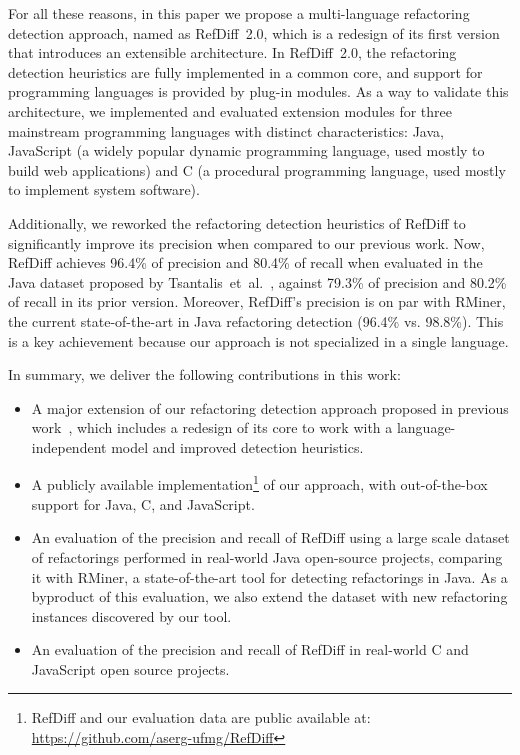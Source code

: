 \documentclass[10pt,journal,compsoc]{IEEEtran}
\begin{document}
For all these reasons, in this paper we propose a multi-language refactoring detection approach, named as RefDiff~2.0, which is a redesign of its first version that introduces an extensible architecture.
In RefDiff~2.0, the refactoring detection heuristics are fully implemented in a common core, and support for programming languages is provided by plug-in modules.
As a way to validate this architecture, we implemented and evaluated extension modules for three mainstream programming languages with distinct characteristics: Java, JavaScript (a widely popular dynamic programming language, used mostly to build web applications) and C (a procedural programming language, used mostly to implement system software).

Additionally, we reworked the refactoring detection heuristics of RefDiff to significantly improve its precision when compared to our previous work.
Now, RefDiff achieves 96.4\% of precision and 80.4\% of recall when evaluated in the Java dataset proposed by Tsantalis~et~al.~\cite{tsantalis2018rminer}, against 79.3\% of precision and 80.2\% of recall in its prior version.
Moreover, RefDiff's precision is on par with RMiner, the current state-of-the-art in Java refactoring detection (96.4\% vs. 98.8\%).
This is a key achievement because our approach is not specialized in a single language.

In summary, we deliver the following contributions in this work:
\begin{itemize}
\item A major extension of our refactoring detection approach proposed in previous work~\cite{msr2017}, which includes a redesign of its core to work with a language-independent model and improved detection heuristics.
\item A publicly available implementation\footnote{RefDiff and our evaluation data are public available at:\\
\url{https://github.com/aserg-ufmg/RefDiff}}
of our approach, with out-of-the-box support for Java, C, and JavaScript.
\item An evaluation of the precision and recall of RefDiff using a large scale dataset of refactorings performed in real-world Java open-source projects, comparing it with RMiner, a state-of-the-art tool for detecting refactorings in Java. As a byproduct of this evaluation, we also extend the dataset with new refactoring instances discovered by our tool.
\item An evaluation of the precision and recall of RefDiff in real-world C and JavaScript open source projects.
\end{itemize}
\end{document}
